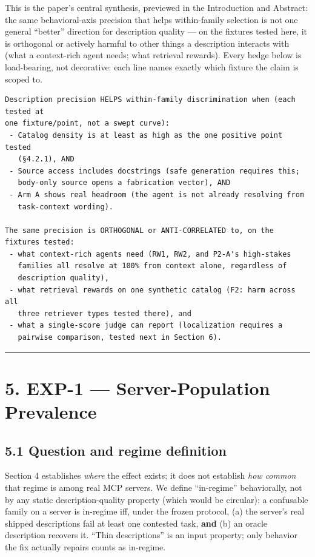 This is the paper's central synthesis, previewed in the Introduction and
Abstract: the same behavioral-axis precision that helps within-family
selection is not one general ``better'' direction for description
quality --- on the fixtures tested here, it is orthogonal or actively
harmful to other things a description interacts with (what a
context-rich agent needs; what retrieval rewards). Every hedge below is
load-bearing, not decorative: each line names exactly which fixture the
claim is scoped to.

\begin{verbatim}
Description precision HELPS within-family discrimination when (each tested at
one fixture/point, not a swept curve):
 - Catalog density is at least as high as the one positive point tested
   (§4.2.1), AND
 - Source access includes docstrings (safe generation requires this;
   body-only source opens a fabrication vector), AND
 - Arm A shows real headroom (the agent is not already resolving from
   task-context wording).

The same precision is ORTHOGONAL or ANTI-CORRELATED to, on the fixtures tested:
 - what context-rich agents need (RW1, RW2, and P2-A's high-stakes
   families all resolve at 100% from context alone, regardless of
   description quality),
 - what retrieval rewards on one synthetic catalog (F2: harm across all
   three retriever types tested there), and
 - what a single-score judge can report (localization requires a
   pairwise comparison, tested next in Section 6).
\end{verbatim}

\begin{center}\rule{0.5\linewidth}{0.5pt}\end{center}

\hypertarget{exp-1-server-population-prevalence}{%
\section{5. EXP-1 --- Server-Population
Prevalence}\label{exp-1-server-population-prevalence}}

\hypertarget{question-and-regime-definition}{%
\subsection{5.1 Question and regime
definition}\label{question-and-regime-definition}}

Section 4 establishes \emph{where} the effect exists; it does not
establish \emph{how common} that regime is among real MCP servers. We
define ``in-regime'' behaviorally, not by any static description-quality
property (which would be circular): a confusable family on a server is
in-regime iff, under the frozen protocol, (a) the server's real shipped
descriptions fail at least one contested task, \textbf{and} (b) an
oracle description recovers it. ``Thin descriptions'' is an input
property; only behavior the fix actually repairs counts as in-regime.

